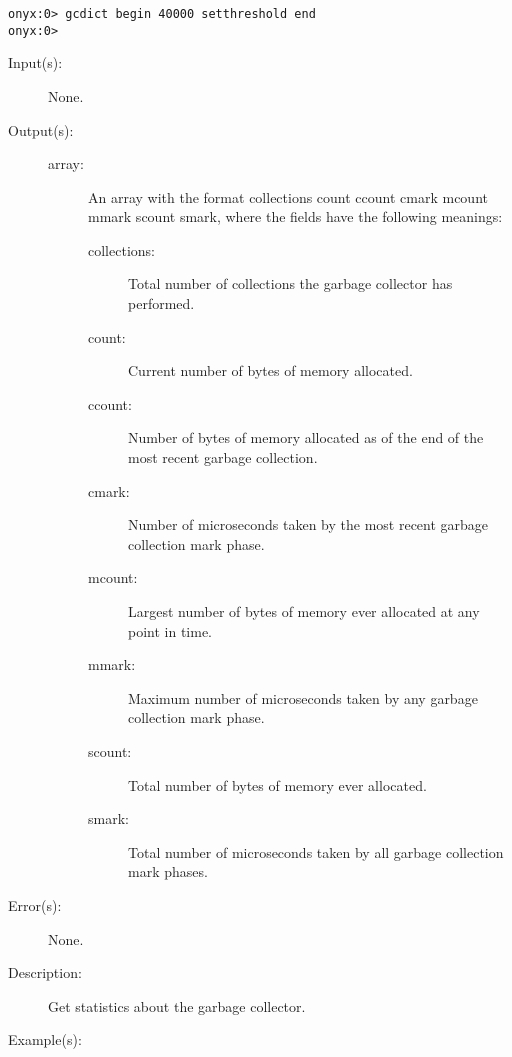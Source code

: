 \begin{description}
\begin{description}
\begin{verbatim}
onyx:0> gcdict begin 40000 setthreshold end
onyx:0>
		\end{verbatim}
	\end{description}
\label{gcdict:stats}
\item[{\onyxop{--}{stats}{array}}: ]
	\begin{description}\item[]
	\item[Input(s): ] None.
	\item[Output(s): ]
		\begin{description}\item[]
		\item[array: ]
			An array with the format {\lb}collections count
			{\lb}ccount cmark{\rb} {\lb}mcount mmark{\rb}
			{\lb}scount smark{\rb}{\rb}, where
			the fields have the following meanings:
			\begin{description}%
			\item[collections: ]
				Total number of collections the garbage
				collector has performed.
			\item[count: ]
				Current number of bytes of memory allocated.
			\item[ccount: ]
				Number of bytes of memory allocated as of the
				end of the most recent garbage collection.
			\item[cmark: ]
				Number of microseconds taken by the most recent
				garbage collection mark phase.
			\item[mcount: ]
				Largest number of bytes of memory ever allocated
				at any point in time.
			\item[mmark: ]
				Maximum number of microseconds taken by any
				garbage collection mark phase.
			\item[scount: ]
				Total number of bytes of memory ever allocated.
			\item[smark: ]
				Total number of microseconds taken by all
				garbage collection mark phases.
			\end{description}
		\end{description}
	\item[Error(s): ] None.
	\item[Description: ]
		Get statistics about the garbage collector.
	\item[Example(s): ]\begin{verbatim}


\end{verbatim}
\end{description}
\end{description}
